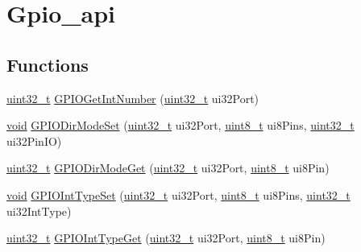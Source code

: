 \hypertarget{group__gpio__api}{}\section{Gpio\+\_\+api}
\label{group__gpio__api}
\subsection*{Functions}
\begin{DoxyCompactItemize}
\item 
\hyperlink{_p_e___types_8h_a33594304e786b158f3fb30289278f5af}{uint32\+\_\+t} \hyperlink{group__gpio__api_ga0c72ea37e36a26a982bfe2587fc2ce40}{G\+P\+I\+O\+Get\+Int\+Number} (\hyperlink{_p_e___types_8h_a33594304e786b158f3fb30289278f5af}{uint32\+\_\+t} ui32\+Port)
\item 
\hyperlink{usb__devapi_8h_afabf60e7f57651d6d595a02c75f07cd0}{void} \hyperlink{group__gpio__api_ga18dc54943796485c7298abd8fdcdcec3}{G\+P\+I\+O\+Dir\+Mode\+Set} (\hyperlink{_p_e___types_8h_a33594304e786b158f3fb30289278f5af}{uint32\+\_\+t} ui32\+Port, \hyperlink{_p_e___types_8h_aba7bc1797add20fe3efdf37ced1182c5}{uint8\+\_\+t} ui8\+Pins, \hyperlink{_p_e___types_8h_a33594304e786b158f3fb30289278f5af}{uint32\+\_\+t} ui32\+Pin\+IO)
\item 
\hyperlink{_p_e___types_8h_a33594304e786b158f3fb30289278f5af}{uint32\+\_\+t} \hyperlink{group__gpio__api_ga6f2d57e3e4d64c9ecbebc8cc4db2b3e1}{G\+P\+I\+O\+Dir\+Mode\+Get} (\hyperlink{_p_e___types_8h_a33594304e786b158f3fb30289278f5af}{uint32\+\_\+t} ui32\+Port, \hyperlink{_p_e___types_8h_aba7bc1797add20fe3efdf37ced1182c5}{uint8\+\_\+t} ui8\+Pin)
\item 
\hyperlink{usb__devapi_8h_afabf60e7f57651d6d595a02c75f07cd0}{void} \hyperlink{group__gpio__api_gad98083fe7f4ce6c4e7daf004768dec1d}{G\+P\+I\+O\+Int\+Type\+Set} (\hyperlink{_p_e___types_8h_a33594304e786b158f3fb30289278f5af}{uint32\+\_\+t} ui32\+Port, \hyperlink{_p_e___types_8h_aba7bc1797add20fe3efdf37ced1182c5}{uint8\+\_\+t} ui8\+Pins, \hyperlink{_p_e___types_8h_a33594304e786b158f3fb30289278f5af}{uint32\+\_\+t} ui32\+Int\+Type)
\item 
\hyperlink{_p_e___types_8h_a33594304e786b158f3fb30289278f5af}{uint32\+\_\+t} \hyperlink{group__gpio__api_gab18d79b27894a1cfb22a1cf21061934a}{G\+P\+I\+O\+Int\+Type\+Get} (\hyperlink{_p_e___types_8h_a33594304e786b158f3fb30289278f5af}{uint32\+\_\+t} ui32\+Port, \hyperlink{_p_e___types_8h_aba7bc1797add20fe3efdf37ced1182c5}{uint8\+\_\+t} ui8\+Pin)
\item 

\end{DoxyCompactItemize}
